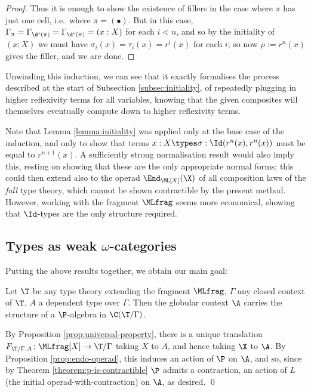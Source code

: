 \begin{proof}
Thus it is enough to show the existence of fillers in the case where $\pi$ has just one cell, i.e.\ where $\pi = ( \bullet )$.  But in this case, $\Gamma_\pi = \Gamma_{\d^i(\pi)} = \Gamma_{\d^i(\pi)} = (x:X)$ for each $i < n$, and so by the initiality of $(x:X)$ we must have $\sigma_i(x) = \tau_i(x) = r^i(x)$ for each $i$; so now $\rho := r^n(x)$ gives the filler, and we are done.
\end{proof}

Unwinding this induction, we can see that it exactly formalises the process described at the start of Subsection \ref{subsec:initiality}, of repeatedly plugging in higher reflexivity terms for all variables, knowing that the given composites will themselves eventually compute down to higher reflexivity terms.

Note that Lemma \ref{lemma:initiality} was applied only at the base case of the induction, and only to show that terms $x:X \types \sigma: \Id(r^n(x),r^n(x))$ must be equal to $r^{n+1}(x)$.  A sufficiently strong normalisation result would also imply this, resting on showing that these are the only appropriate normal forms; this could then extend also to the operad $\End_{\ML[X]}(\X)$ of all composition laws of the \emph{full} type theory, which cannot be shown contractible by the present method.  However, working with the fragment $\MLfrag$ seems more economical, showing that $\Id$-types are the only structure required.

\subsection{Types as weak \texorpdfstring{$\omega$}{omega}-categories} \label{subsec:payoff}

Putting the above results together, we obtain our main goal:

\begin{thm}Let $\T$ be any type theory extending the fragment $\MLfrag$, $\Gamma$ any closed context of $\T$, $A$ a dependent type over $\Gamma$.  Then the globular context $\A$ carries the structure of a $\P$-algebra in $\C(\T/\Gamma)$.
\end{thm}

\proof By Proposition \ref{prop:universal-property}, there is a unique translation $F_{\T/\Gamma,A} \colon  \MLfrag[X] \to \T/\Gamma$ taking $X$ to $A$, and hence taking $\X$ to $\A$.  By Proposition \ref{prop:endo-operad}, this induces an action of $\P$ on $\A$, and so, since by Theorem \ref{theorem:p-is-contractible} $\P$ admits a contraction, an action of $L$ (the initial operad-with-contraction) on $\A$, as desired. \qed

